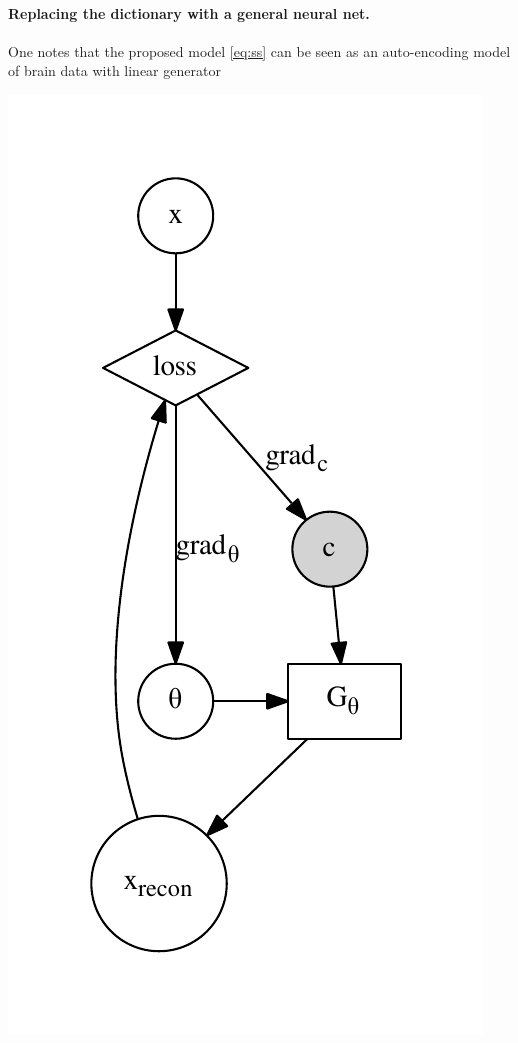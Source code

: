 \paragraph{Replacing the dictionary with a general neural net.}
One notes that the proposed model \eqref{eq:ss} can be seen as an auto-encoding model of brain data with linear generator
\begin{marginfigure}
  \includegraphics[width=1\linewidth]{figures/gen_model.pdf}

\end{marginfigure}
